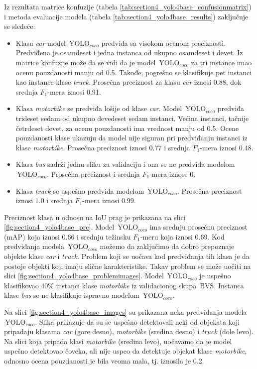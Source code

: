 \documentclass[12pt,oneside]{memoir}
\newcommand{\yolo}{\ensuremath{\,\textrm{YOLO}}}
\newcommand{\bvs}{\ensuremath{\,\textrm{BVS}}}
\begin{document}
Iz rezultata matrice konfuzije (tabela \ref{tab:section4_yolo4base_confusionmatrix}) i metoda evaluacije modela (tabela \ref{tab:section4_yolo4base_results}) zaključuje se sledeće:
\begin{itemize}
    \item Klasu \textit{car} model $\yolo_{coco}$ predviđa sa visokom ocenom preciznosti. Predviđena je osamdeset i jedna instanca od ukupno osamdeset i devet. Iz matrice konfuzije može da se vidi da je model $\yolo_{coco}$ za tri instance imao ocenu pouzdanosti manju od 0.5. Takođe, pogrešno se klasifikuje pet instanci kao instance klase \textit{truck}. Prosečna preciznost za klasu \textit{car} iznosi 0.88, dok srednja $F_1$-mera iznosi 0.91.
    \item Klasa \textit{motorbike} se predviđa lošije od klase \textit{car}. Model $\yolo_{coco}$ predviđa trideset sedam od ukupno devedeset sedam instanci. Većina instanci, tačnije četrdeset devet, za ocenu pouzdanosti ima vrednost manju od 0.5. Ocene pouzdanosti klase ukazuju da model nije siguran pri predviđanju instanci iz klase \textit{motorbike}. Prosečna preciznost iznosi 0.77 i srednja $F_1$-mera iznosi 0.48.
    \item Klasa \textit{bus} sadrži jednu sliku za validaciju i ona se ne predviđa modelom $\yolo_{coco}$. Prosečna preciznost i srednja $F_1$-mera iznose 0.
    \item Klasa \textit{truck} se uspešno predviđa modelom $\yolo_{coco}$. Prosečna preciznost iznosi 1.0 i srednja $F_1$-mera iznosi 0.99.
\end{itemize}

Preciznost klasa u odnosu na IoU prag je prikazana na slici \ref{fig:section4_yolo4base_prc}. Model $\yolo_{coco}$ ima srednju prosečnu preciznost (mAP) koja iznosi 0.66 i srednju težinsku $F_1$-meru koja iznosi 0.69. Kod predviđanja modela $\yolo_{coco}$ možemo da zaključimo da dobro prepoznaje objekte klase \textit{car} i \textit{truck}. Problem koji se uočava kod predviđanja tih klasa je da postoje objekti koji imaju slične karakteristike. Takav problem se može uočiti na slici \ref{fig:section4_yolo4base_problemimages}. Model $\yolo_{coco}$ je uspešno klasifikovao 40\% instanci klase \textit{motorbike} iz validacionog skupa \bvs. Instanca klase \textit{bus} se ne klasifikuje ispravno modelom  $\yolo_{coco}$.

Na slici \ref{fig:section4_yolo4base_images} su prikazana neka predviđanja modela $\yolo_{coco}$. Slika prikazuje da su se uspešno detektovali neki od objekata koji pripadaju klasama \textit{car} (gore desno), \textit{motorbike} (sredina desno) i \textit{truck} (dole levo). Na slici koja pripada klasi \textit{motorbike} (sredina levo), uočavamo da je model uspešno detektovao čoveka, ali nije uspeo da detektuje objekat klase \textit{motorbike}, odnosno ocena pouzdanosti je bila veoma mala, tj. iznosila je 0.2. 
\end{document}
